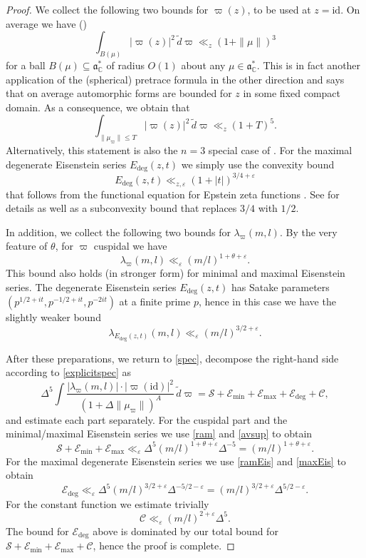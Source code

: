 \documentclass[11pt,oneside]{amsart}
\numberwithin{equation}{section}
\theoremstyle{remark}
\theoremstyle{plain}
\newcommand\id{\mathrm{id}}
\newcommand\CC{\mathbb{C}}
\newcommand\mfa{\mathfrak{a}}
\newcommand\eps{\varepsilon}
\renewcommand\leq{\leqslant}
\begin{document}
\begin{proof}
We collect the following two bounds for $\varpi(z)$, to be used at $z=\id$. On average we have (\cite[Lem.~1]{Blomer-Lutsko})
\[
\int_{B(\mu)} |\varpi(z)|^2 \,\tilde d\varpi\ll_z (1 + \| \mu \|)^3
\]
for a ball $B(\mu) \subseteq \mfa_{\CC}^{\ast}$ of radius $O(1)$ about any $\mu \in \mfa_{\CC}^{\ast}$. This is in fact another application of the (spherical) pretrace formula in the other direction and says that on average automorphic forms are bounded for $z$ in some fixed compact domain. As a consequence, we obtain that
\begin{equation}\label{avsup}
\int_{\|\mu_\varpi\|\leq T} |\varpi(z)|^2 \,\tilde d\varpi \ll_z (1 + T)^5.
\end{equation}
Alternatively, this statement is also the $n=3$ special case of \cite[Prop.~4.17]{MR4720461}.
For the maximal degenerate Eisenstein series $E_{\deg}(z, t)$ we simply use the convexity bound
\begin{equation}\label{maxEis}
E_{\deg}(z, t) \ll_{z,\eps} (1+|t|)^{3/4 +\eps}
\end{equation}
that follows from the functional equation for Epstein zeta functions \cite[Prop.~10.7.5]{MR2254662}. See \cite[Th.~1]{Blomer} for details as well as a subconvexity bound that replaces $3/4$ with $1/2$. 

In addition, we collect the following two bounds for $\lambda_{\varpi}(m,l)$. By the very feature of $\theta$, for $\varpi$ cuspidal we have 
\begin{equation}\label{ram}
\lambda_{\varpi}(m, l) \ll_{\eps} (m/l)^ {1 + \theta  + \eps}.
\end{equation}
This bound also holds (in stronger form) for minimal and maximal Eisenstein series. The degenerate Eisenstein series $E_{\deg}(z, t)$ has Satake parameters $(p^{1/2 + it}, p^{-1/2 + it}, p^{-2it})$ at a finite prime $p$, hence in this case we have the slightly weaker bound
\begin{equation}\label{ramEis}
\lambda_{E_{\deg}(z, t)}(m, l) \ll_{\eps} (m/l)^{3/2 + \eps}.
\end{equation}

After these preparations, we return to \eqref{spec}, decompose the right-hand side according to \eqref{explicitspec} as
$$\Delta^5 \int \frac{|\lambda_{\varpi}(m, l)|\cdot|\varpi(\id)|^2}{(1 + \Delta \| \mu_{\varpi} \|)^{A}} \,\tilde{d}\varpi =  \mathscr{S} + \mathscr{E}_{\min} + \mathscr{E}_{\max} + \mathscr{E}_{\deg} + \mathscr{C},$$
 and estimate each part   separately. For the cuspidal part and the minimal/maximal Eisenstein series we use \eqref{ram} and \eqref{avsup} to obtain 
$$ \mathscr{S} + \mathscr{E}_{\min} + \mathscr{E}_{\max}  \ll_{\eps} \Delta^5 (m/l)^{ 1+\theta +\eps} \Delta^{-5} = (m/l)^{ 1 + \theta + \eps} .$$
For the maximal degenerate Eisenstein series we use \eqref{ramEis} and \eqref{maxEis} to obtain
$$\mathscr{E}_{\deg}  \ll_{\eps} \Delta^5 (m/l)^{3/2 + \eps} \Delta^{-5/2 - \eps} = (m/l)^{3/2 + \eps} \Delta^{5/2 - \eps}.$$
For the constant function we estimate trivially
$$\mathscr{C} \ll_\eps (m/l)^{2+\eps} \Delta^5.$$
The bound for $\mathscr{E}_{\deg}$ above is dominated by our total bound for $\mathscr{S}+\mathscr{E}_{\min}+\mathscr{E}_{\max}+\mathscr{C}$, hence the proof is complete.
\end{proof}
\end{document}
